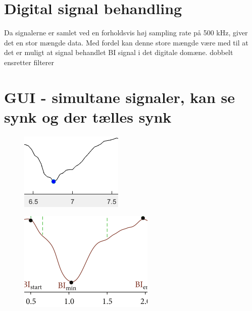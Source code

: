 \section{Digital signal behandling}
Da signalerne er samlet ved en forholdsvis høj sampling rate på 500 kHz, giver det en stor mængde data. Med fordel kan denne store mængde være med til at det er muligt at signal behandlet BI signal i det digitale domæne.
dobbelt ensretter
filterer

\section{GUI - simultane signaler, kan se synk og der tælles synk}


\begin{figure}[H]
\centering
\begin{minipage}{.5\textwidth}
  \centering
  \includegraphics[width=.8\linewidth]{Figure/synkfraGUI}
  \label{fig:integrationstestVCCSud}
\end{minipage}%
\begin{minipage}{.5\textwidth}
  \centering
  \includegraphics[width=.8\linewidth]{Figure/synkfraArtikel}
  \label{fig:integrationstestINA2udstrom}
\end{minipage}
\end{figure}


